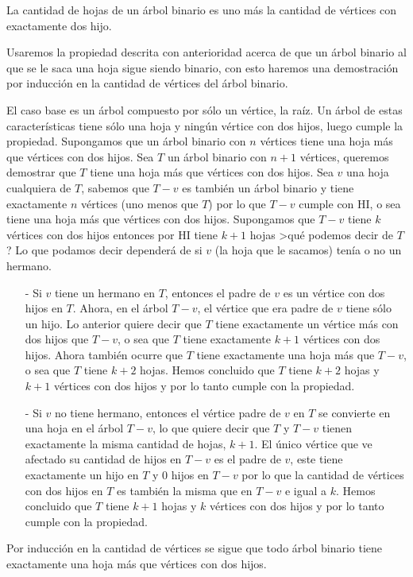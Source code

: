 \begin{teorema}
La cantidad de hojas de un árbol binario es uno más la cantidad de vértices con exactamente dos hijo.

\begin{demostracion}
Usaremos la propiedad descrita con anterioridad acerca de que un árbol binario al que se le saca una hoja sigue siendo binario, con esto haremos una demostración por inducción en la cantidad de vértices del árbol binario.
\begin{inducciondemo}
  \BI El caso base es un árbol compuesto por sólo un vértice, la raíz.
  Un árbol de estas características tiene sólo una hoja y ningún vértice con dos hijos, luego cumple la propiedad.
  \HI Supongamos que un árbol binario con $n$ vértices tiene una hoja más que vértices con dos hijos.
  \TI Sea $T$ un árbol binario con $n+1$ vértices, queremos demostrar que $T$ tiene una hoja más que vértices con dos hijos.
  Sea $v$ una hoja cualquiera de $T$, sabemos que $T-v$ es también un árbol binario y tiene exactamente $n$ vértices (uno menos que $T$) por lo que $T-v$ cumple con HI, o sea tiene una hoja más que vértices con dos hijos.
  Supongamos que $T-v$ tiene $k$ vértices con dos hijos entonces por HI tiene $k+1$ hojas >qué podemos decir de $T$?
  Lo que podamos decir dependerá de si $v$ (la hoja que le sacamos) tenía o no un hermano.
  \begin{itemize}
    \item[-] Si $v$ tiene un hermano en $T$, entonces el padre de $v$ es un vértice con dos hijos en $T$.
    Ahora, en el árbol $T-v$, el vértice que era padre de $v$ tiene sólo un hijo.
    Lo anterior quiere decir que $T$ tiene exactamente un vértice más con dos hijos que $T-v$, o sea que $T$ tiene exactamente $k+1$ vértices con dos hijos.
    Ahora también ocurre que $T$ tiene exactamente una hoja más que $T-v$, o sea que $T$ tiene $k+2$ hojas.
    Hemos concluido que $T$ tiene $k+2$ hojas y $k+1$ vértices con dos hijos y por lo tanto cumple con la propiedad.
    \item[-] Si $v$ no tiene hermano, entonces el vértice padre de $v$ en $T$ se convierte en una hoja en el árbol $T-v$, lo que quiere decir que $T$ y $T-v$ tienen exactamente la misma cantidad de hojas, $k+1$.
    El único vértice que ve afectado su cantidad de hijos en $T-v$ es el padre de $v$, este tiene exactamente un hijo en $T$ y $0$ hijos en $T-v$ por lo que la cantidad de vértices con dos hijos en $T$ es también la misma que en $T-v$ e igual a $k$.
    Hemos concluido que $T$ tiene $k+1$ hojas y $k$ vértices con dos hijos y por lo tanto cumple con la propiedad.
  \end{itemize}
  Por inducción en la cantidad de vértices se sigue que todo árbol binario tiene exactamente una hoja más que vértices con dos hijos.
\end{inducciondemo}
\end{demostracion}
\end{teorema}

